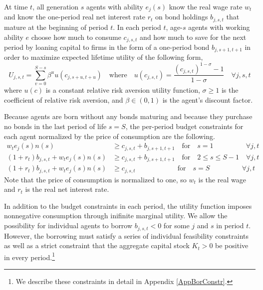 \documentclass[letterpaper,12pt]{article}
\theoremstyle{definition}
\begin{document}
\begin{spacing}{1.5}
    At time $t$, all generation $s$ agents with ability $e_j(s)$ know the real wage rate $w_t$ and know the one-period real net interest rate $r_t$ on bond holdings $b_{j,s,t}$ that mature at the beginning of period $t$. In each period $t$, age-$s$ agents with working ability $e$ choose how much to consume $c_{j,s,t}$ and how much to save for the next period by loaning capital to firms in the form of a one-period bond $b_{j,s+1,t+1}$ in order to maximize expected lifetime utility of the following form,
    \begin{equation}\label{EqUtilMax}
      U_{j,s,t} = \sum_{v=0}^{S-s}\beta^u u\left(c_{j,s+u,t+u}\right) \quad \text{where} \quad u\left(c_{j,s,t}\right) = \frac{\left(c_{j,s,t}\right)^{1-\sigma} - 1}{1-\sigma} \quad\forall j,s,t
    \end{equation}
    where $u(c)$ is a constant relative risk aversion utility function, $\sigma\geq 1$ is the coefficient of relative risk aversion, and $\beta\in(0,1)$ is the agent's discount factor.

    Because agents are born without any bonds maturing and because they purchase no bonds in the last period of life $s=S$, the per-period budget constraints for each agent normalized by the price of consumption are the following.
    \begin{align}
      w_t e_j(s)n(s) &\geq c_{j,s,t} + b_{j,s+1,t+1} \quad \text{for} \quad s = 1 \quad\quad\quad\quad\:\:\: \forall j,t \label{EqBC1} \\
      \left(1 + r_t\right) b_{j,s,t} + w_t e_j(s)n(s) &\geq c_{j,s,t} + b_{j,s+1,t+1} \quad \text{for} \quad 2\leq s \leq S-1 \quad \forall j,t \label{EqBC2} \\
      \left(1 + r_t\right) b_{j,s,t} + w_t e_j(s)n(s) &\geq c_{j,s,t} \quad\quad\quad\quad\quad\quad \text{for} \quad s = S \quad\quad\quad\quad\:\:\, \forall j,t \label{EqBC3}
    \end{align}
    Note that the price of consumption is normalized to one, so $w_t$ is the real wage and $r_t$ is the real net interest rate.

    In addition to the budget constraints in each period, the utility function imposes nonnegative consumption through inifinite marginal utility. We allow the possibility for individual agents to borrow $b_{j,s,t}<0$ for some $j$ and $s$ in period $t$. However, the borrowing must satisfy a series of individual feasibility constraints as well as a strict constraint that the aggregate capital stock $K_t>0$ be positive in every period.\footnote{We describe these constraints in detail in Appendix \ref{AppBorConstr}.}


\end{spacing}
\end{document}
